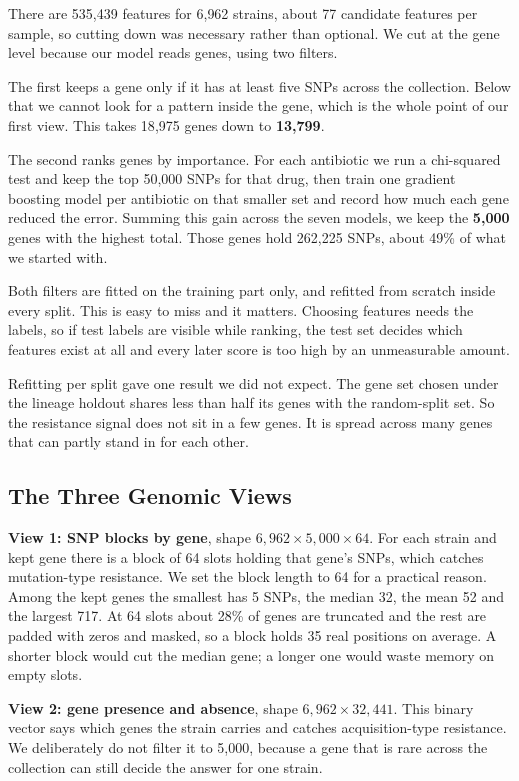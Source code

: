 \documentclass[conference]{IEEEtran}
\begin{document}
There are 535{,}439 features for 6{,}962 strains, about 77 candidate features per
sample, so cutting down was necessary rather than optional. We cut at the gene level
because our model reads genes, using two filters.

The first keeps a gene only if it has at least five SNPs across the collection.
Below that we cannot look for a pattern inside the gene, which is the whole point of
our first view. This takes 18{,}975 genes down to \textbf{13{,}799}.

The second ranks genes by importance. For each antibiotic we run a chi-squared test
and keep the top 50{,}000 SNPs for that drug, then train one gradient boosting model
per antibiotic on that smaller set and record how much each gene reduced the error.
Summing this gain across the seven models, we keep the \textbf{5{,}000} genes with
the highest total. Those genes hold 262{,}225 SNPs, about 49\% of what we started
with.

Both filters are fitted on the training part only, and refitted from scratch inside
every split. This is easy to miss and it matters. Choosing features needs the labels,
so if test labels are visible while ranking, the test set decides which features
exist at all and every later score is too high by an unmeasurable amount.

Refitting per split gave one result we did not expect. The gene set chosen under the
lineage holdout shares less than half its genes with the random-split set. So the
resistance signal does not sit in a few genes. It is spread across many genes that
can partly stand in for each other.

\subsection{The Three Genomic Views}

\textbf{View 1: SNP blocks by gene}, shape $6{,}962 \times 5{,}000 \times 64$. For
each strain and kept gene there is a block of 64 slots holding that gene's SNPs,
which catches mutation-type resistance. We set the block length to 64 for a
practical reason. Among the kept genes the smallest has 5 SNPs, the median 32, the
mean 52 and the largest 717. At 64 slots about 28\% of genes are truncated and the
rest are padded with zeros and masked, so a block holds 35 real positions on
average. A shorter block would cut the median gene; a longer one would waste memory
on empty slots.

\textbf{View 2: gene presence and absence}, shape $6{,}962 \times 32{,}441$. This
binary vector says which genes the strain carries and catches acquisition-type
resistance. We deliberately do not filter it to 5{,}000, because a gene that is rare
across the collection can still decide the answer for one strain.
\end{document}
